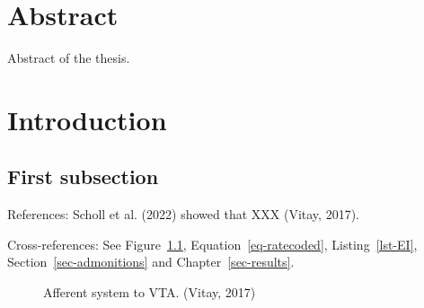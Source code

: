 \documentclass[
  11pt,
  a4paper,
]{scrbook}
\renewcommand*\contentsname{Table of contents}
\newcommand\contentsname{Table of contents}
\begin{document}
\cleardoublepage
\renewcommand*\contentsname{Table of contents}
{
\hypersetup{linkcolor=}
\setcounter{tocdepth}{2}
\tableofcontents
}
\mainmatter
{}

\chapter*{Abstract}\label{abstract}


Abstract of the thesis.


\chapter{Introduction}\label{sec-introduction}

\section{First subsection}\label{first-subsection}

References: Scholl et al. (2022) showed that XXX (Vitay, 2017).

Cross-references: See Figure~\ref{fig-dopamine},
Equation~\ref{eq-ratecoded}, Listing~\ref{lst-EI},
Section~\ref{sec-admonitions} and Chapter~\ref{sec-results}.

\begin{figure}


\caption{\label{fig-dopamine}Afferent system to VTA. (Vitay, 2017)}

\end{figure}%
\end{document}
